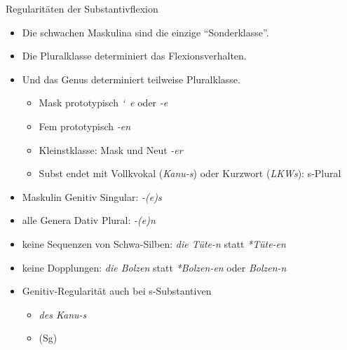 \begin{frame}
  {Regularitäten der Substantivflexion}
  \pause
  \begin{itemize}[<+->]
    \item Die schwachen Maskulina sind die einzige "`Sonderklasse"'.
    \item \alert{Die Pluralklasse determiniert das Flexionsverhalten.}
    \item \alert{Und das Genus determiniert teilweise Pluralklasse.}
      \begin{itemize}[<+->]
        \item \alert{Mask prototypisch \textit{\char`~e} oder \textit{-e}}
        \item \alert{Fem prototypisch \textit{-en}}
        \item Kleinstklasse: Mask und Neut \textit{-er}
        \item Subst endet mit Vollkvokal (\textit{Kanu-s}) oder Kurzwort (\textit{LKWs}): s-Plural
      \end{itemize}
    \Halbzeile
  \item \alert{Maskulin Genitiv Singular: \textit{-(e)s}} 
    \item \alert{alle Genera Dativ Plural: \textit{-(e)n}}
    \item keine Sequenzen von Schwa-Silben: \textit{die Tüte-n} statt \textit{*Tüte-en}
    \item keine Dopplungen: \textit{die Bolzen} statt \textit{*Bolzen-en} oder \textit{Bolzen-n}
      \Halbzeile
    \item Genitiv-Regularität auch bei s-Substantiven
      \begin{itemize}[<+->]
        \item \textit{des Kanu-s}
        \item {} (Sg)
      \end{itemize}
  \end{itemize}
\end{frame}

